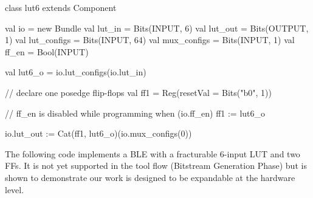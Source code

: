 \clearpage

\begin{scala}
class lut6 extends Component {                     
  val io = new Bundle {                            
    val lut_in = Bits(INPUT, 6)                    
    val lut_out = Bits(OUTPUT, 1)                  
    val lut_configs = Bits(INPUT, 64)              
    val mux_configs = Bits(INPUT, 1)               
    val ff_en = Bool(INPUT)                        
  }                                                
                                                   
  val lut6_o = io.lut_configs(io.lut_in)           
                                                   
  // declare one posedge flip-flops                
  val ff1 = Reg(resetVal = Bits("b0", 1))          
                                                   
  // ff_en is disabled while programming           
  when (io.ff_en) {                                
    ff1 := lut6_o                                  
  }                                                
                                                   
  io.lut_out := Cat(ff1, lut6_o)(io.mux_configs(0))
}                                                  
\end{scala}

The following code implements a BLE with a fracturable 6-input LUT and two FFs. It is not yet supported
in the tool flow (Bitstream Generation Phase) but is shown to demonstrate our work is designed to be expandable
at the hardware level. \par


